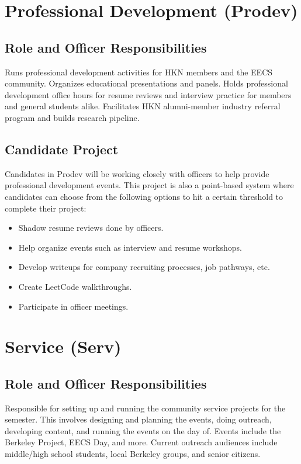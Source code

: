 \documentclass[11pt, article, oneside]{memoir}
\begin{document}
    \section{Professional Development (Prodev)}
    \subsection{Role and Officer Responsibilities}
        Runs professional development activities for HKN members and the EECS community.
        Organizes educational presentations and panels.
        Holds professional development office hours for resume reviews and interview practice for members and general students alike.
        Facilitates HKN alumni-member industry referral program and builds research pipeline.

    \subsection{Candidate Project}
        Candidates in Prodev will be working closely with officers to help provide professional development events.
        This project is also a point-based system where candidates can choose from the following options to hit a certain threshold to complete their project:
        \begin{itemize}
            \item Shadow resume reviews done by officers.
            \item Help organize events such as interview and resume workshops.
            \item Develop writeups for company recruiting processes, job pathways, etc.
            \item Create LeetCode walkthroughs.
            \item Participate in officer meetings.
        \end{itemize}

    \section{Service (Serv)}
    \subsection{Role and Officer Responsibilities}
        Responsible for setting up and running the community service projects for the semester.
        This involves designing and planning the events, doing outreach, developing content, and running the events on the day of.
        Events include the Berkeley Project, EECS Day, and more.
        Current outreach audiences include middle/high school students, local Berkeley groups, and senior citizens.
\end{document}
